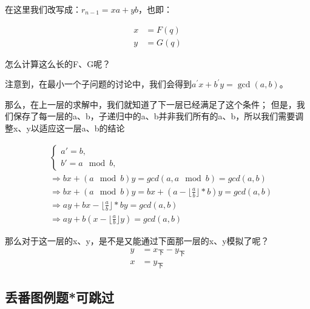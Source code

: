 \documentclass[12pt]{article}
\begin{document}
在这里我们改写成：$r_{n-1}=xa+yb$，也即：

\begin{align*}
    x&=F(q)\\
    y&=G(q)
\end{align*}

怎么计算这么长的F、G呢？

注意到，在最小一个子问题的讨论中，我们会得到$a^{'}x+b^{'}y=\gcd(a,b)$。

那么，在上一层的求解中，我们就知道了下一层已经满足了这个条件；
但是，我们保存了每一层的a、b，子递归中的a、b并非我们所有的a、b，所以我们需要调整x、y以适应这一层a、b的结论

\begin{align*}
    &\begin{cases}
        a' = b,\\
        b' = a \mod b,
    \end{cases}\\
    &\Rightarrow bx+(a\mod b)y=gcd(a,a\mod b)=gcd(a,b)\\
    &\Rightarrow bx+(a\mod b)y=bx+(a-\lfloor\frac{a}{b}\rfloor*b)y=gcd(a,b)\\
    &\Rightarrow ay+bx-\lfloor\frac{a}{b}\rfloor*b y=gcd(a,b)\\
    &\Rightarrow ay+b(x-\lfloor\frac{a}{b}\rfloor y)=gcd(a,b)
\end{align*}

那么对于这一层的x、y，是不是又能通过下面那一层的x、y模拟了呢？
\begin{align*}
    y&=x_{\text{下}}-y_{\text{下}}\\
    x&=y_{\text{下}}
\end{align*}



\subsection{丢番图例题*可跳过}
\end{document}
